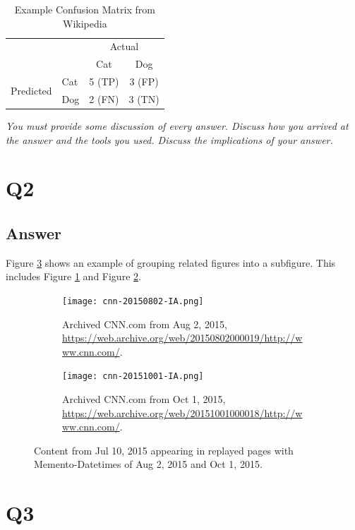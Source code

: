 \documentclass[12pt]{article}
\begin{document}
\begin{table}[h]
\centering
\caption{Example Confusion Matrix from Wikipedia}
\label{tbl:confusion}
\begin{tabular}{l|l|c|c|}
\multicolumn{2}{c}{}&\multicolumn{2}{c}{Actual}\\
\cline{3-4}
\multicolumn{2}{c|}{}&Cat&Dog\\
\cline{2-4}
\multirow{2}{*}{Predicted}& Cat & 5 (TP) & 3 (FP)\\
\cline{2-4}
& Dog & 2 (FN) & 3 (TN) \\
\cline{2-4}
\end{tabular}
\end{table}

\emph{You must provide some discussion of every answer. Discuss how you arrived at the answer and the tools you used. Discuss the implications of your answer.}

\section*{Q2}

\subsection*{Answer}

Figure \ref{fig:subfigure-ex} shows an example of grouping related figures into a subfigure.  This includes Figure \ref{fig:cnn-2015aug02} and Figure \ref{fig:cnn-2015oct01}.
\begin{figure}[ht]
\centering
\begin{subfigure}{0.45\textwidth}
  \centering
  \texttt{[image: cnn-20150802-IA.png]}
  \caption{Archived CNN.com from Aug 2, 2015, \url{https://web.archive.org/web/20150802000019/http://www.cnn.com/}.}
\label{fig:cnn-2015aug02}
\end{subfigure}
\hspace{20pt}
\begin{subfigure}{0.45\textwidth}
  \centering
  \texttt{[image: cnn-20151001-IA.png]}
  \caption{Archived CNN.com from Oct 1, 2015, \url{https://web.archive.org/web/20151001000018/http://www.cnn.com/}.}
\label{fig:cnn-2015oct01}
\end{subfigure}%
\caption{Content from Jul 10, 2015 appearing in replayed pages with Memento-Datetimes of Aug 2, 2015 and Oct 1, 2015.}
\label{fig:subfigure-ex}
\end{figure}

\section*{Q3}
\end{document}
